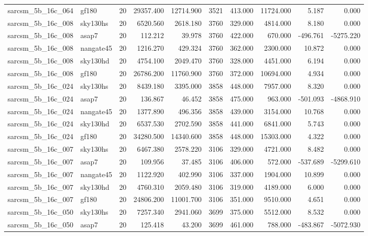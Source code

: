 \begin{tabular}{llrrrrrrrr}
sarcsm\_5b\_16c\_064 & gf180 & 20 & 29357.400 & 12714.900 & 3521 & 413.000 & 11724.000 & 5.187 & 0.000 \\
sarcsm\_5b\_16c\_008 & sky130hs & 20 & 6520.560 & 2618.180 & 3760 & 329.000 & 4814.000 & 8.180 & 0.000 \\
sarcsm\_5b\_16c\_008 & asap7 & 20 & 112.212 & 39.978 & 3760 & 422.000 & 670.000 & -496.761 & -5275.220 \\
sarcsm\_5b\_16c\_008 & nangate45 & 20 & 1216.270 & 429.324 & 3760 & 362.000 & 2300.000 & 10.872 & 0.000 \\
sarcsm\_5b\_16c\_008 & sky130hd & 20 & 4754.100 & 2049.470 & 3760 & 328.000 & 4451.000 & 6.194 & 0.000 \\
sarcsm\_5b\_16c\_008 & gf180 & 20 & 26786.200 & 11760.900 & 3760 & 372.000 & 10694.000 & 4.934 & 0.000 \\
sarcsm\_5b\_16c\_024 & sky130hs & 20 & 8439.180 & 3395.000 & 3858 & 448.000 & 7957.000 & 8.320 & 0.000 \\
sarcsm\_5b\_16c\_024 & asap7 & 20 & 136.867 & 46.452 & 3858 & 475.000 & 963.000 & -501.093 & -4868.910 \\
sarcsm\_5b\_16c\_024 & nangate45 & 20 & 1377.890 & 496.356 & 3858 & 439.000 & 3154.000 & 10.768 & 0.000 \\
sarcsm\_5b\_16c\_024 & sky130hd & 20 & 6537.530 & 2702.590 & 3858 & 441.000 & 6841.000 & 5.743 & 0.000 \\
sarcsm\_5b\_16c\_024 & gf180 & 20 & 34280.500 & 14340.600 & 3858 & 448.000 & 15303.000 & 4.322 & 0.000 \\
sarcsm\_5b\_16c\_007 & sky130hs & 20 & 6467.380 & 2578.220 & 3106 & 329.000 & 4721.000 & 8.482 & 0.000 \\
sarcsm\_5b\_16c\_007 & asap7 & 20 & 109.956 & 37.485 & 3106 & 406.000 & 572.000 & -537.689 & -5299.610 \\
sarcsm\_5b\_16c\_007 & nangate45 & 20 & 1122.920 & 402.990 & 3106 & 337.000 & 1904.000 & 10.899 & 0.000 \\
sarcsm\_5b\_16c\_007 & sky130hd & 20 & 4760.310 & 2059.480 & 3106 & 319.000 & 4189.000 & 6.000 & 0.000 \\
sarcsm\_5b\_16c\_007 & gf180 & 20 & 24806.200 & 11001.700 & 3106 & 351.000 & 9510.000 & 4.651 & 0.000 \\
sarcsm\_5b\_16c\_050 & sky130hs & 20 & 7257.340 & 2941.060 & 3699 & 375.000 & 5512.000 & 8.532 & 0.000 \\
sarcsm\_5b\_16c\_050 & asap7 & 20 & 125.418 & 43.200 & 3699 & 461.000 & 788.000 & -483.867 & -5072.930 \\

\end{tabular}
